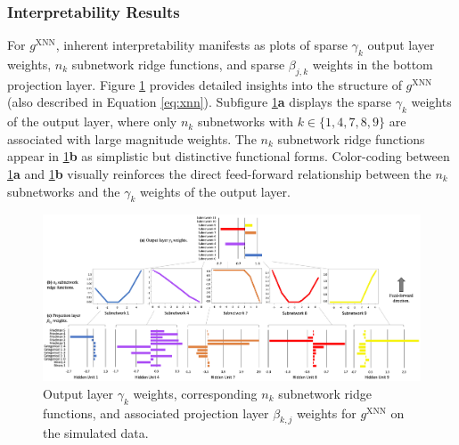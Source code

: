 \documentclass[information,article,submit,moreauthors,pdftex]{definitions/mdpi}
\begin{document}
\subsubsection{Interpretability Results}\label{ssec:xnn_sim}

For $g^\text{XNN}$, inherent interpretability manifests as plots of sparse $\gamma_k$ output layer weights, $n_k$ subnetwork ridge functions, and sparse $\beta_{j,k}$ weights in the bottom projection layer. Figure \ref{fig:sim_xnn_glob_ridge} provides detailed insights into the structure of $g^\text{XNN}$ (also described in Equation \ref{eq:xnn}). Subfigure \ref{fig:sim_xnn_glob_ridge}\textbf{a} displays the sparse $\gamma_k$ weights of the output layer, where only $n_k$ subnetworks with $k \in \{1, 4, 7, 8, 9\}$ are associated with large magnitude weights. The $n_k$ subnetwork ridge functions appear in \ref{fig:sim_xnn_glob_ridge}\textbf{b} as simplistic but distinctive functional forms. Color-coding between \ref{fig:sim_xnn_glob_ridge}\textbf{a} and \ref{fig:sim_xnn_glob_ridge}\textbf{b} visually reinforces the direct feed-forward relationship between the $n_k$ subnetworks and the $\gamma_k$ weights of the output layer.

\begin{figure}[H]
	\hskip-35pt\includegraphics[width=19cm]{img/sim_xnn_glob_ridge.png}
	\caption{Output layer $\gamma_k$ weights, corresponding $n_k$ subnetwork ridge functions, and associated projection layer $\beta_{k,j}$ weights for $g^\text{XNN}$ on the simulated data.}
	\label{fig:sim_xnn_glob_ridge}
\end{figure} 
\end{document}
